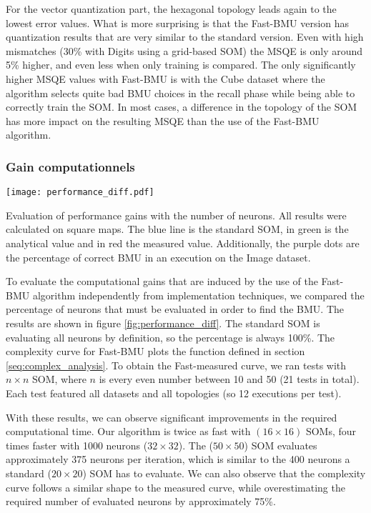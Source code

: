 	For the vector quantization part, the hexagonal topology leads again to the lowest error values. What is more surprising is that the Fast-BMU version has quantization results that are very similar to the standard version. Even with high mismatches (30\% with Digits using a grid-based SOM) the MSQE is only around 5\% higher, and even less when only training is compared. The only significantly higher MSQE values with Fast-BMU is with the Cube dataset where the algorithm selects quite bad BMU choices in the recall phase while being able to correctly train the SOM. In most cases, a difference in the topology of the SOM has more impact on the resulting MSQE than the use of the Fast-BMU algorithm. 

	\subsubsection{Gain computationnels}

	\begin{figureth}
    	\centering
    	\texttt{[image: performance\_diff.pdf]}
    	\caption{Evaluation of performance gains with the number of neurons. All results were calculated on square maps. The blue line is the standard SOM, in green is the analytical value and in red the measured value. Additionally, the purple dots are the percentage of correct BMU in an execution on the Image dataset.}
    	\label{fig:performance_diff}
	\end{figureth}


	To evaluate the computational gains that are induced by the use of the Fast-BMU algorithm independently from implementation techniques, we compared the percentage of neurons that must be evaluated in order to find the BMU. The results are shown in figure \ref{fig:performance_diff}. The standard SOM is evaluating all neurons by definition, so the percentage is always 100\%. The complexity curve for Fast-BMU plots the function defined in section \ref{seq:complex_analysis}. To obtain the Fast-measured curve, we ran tests with $n\times n$ SOM, where $n$ is every even number between 10 and 50 (21 tests in total). Each test featured all datasets and all topologies (so 12 executions per test). 

	With these results, we can observe significant improvements in the required computational time. Our algorithm is twice as fast with $(16\times16)$ SOMs, four times faster with 1000 neurons ($32\times32$). The ($50\times50$) SOM evaluates approximately 375 neurons per iteration, which is similar to the 400 neurons a standard ($20\times20$) SOM has to evaluate. We can also observe that the complexity curve follows a similar shape to the measured curve, while overestimating the required number of evaluated neurons by approximately 75\%.	

